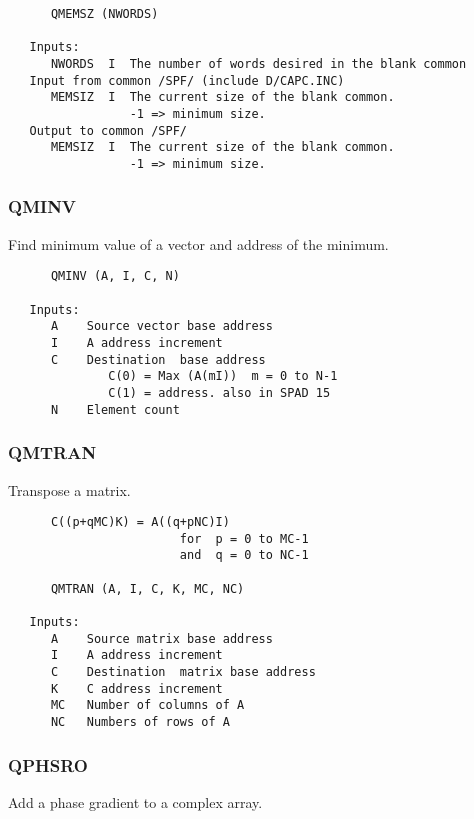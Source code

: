 \begin{verbatim}
      QMEMSZ (NWORDS)

   Inputs:
      NWORDS  I  The number of words desired in the blank common
   Input from common /SPF/ (include D/CAPC.INC)
      MEMSIZ  I  The current size of the blank common.
                 -1 => minimum size.
   Output to common /SPF/
      MEMSIZ  I  The current size of the blank common.
                 -1 => minimum size.

\end{verbatim}
\subsubsection{QMINV }
Find minimum value of a vector and address of the minimum.

\begin{verbatim}
      QMINV (A, I, C, N)

   Inputs:
      A    Source vector base address
      I    A address increment
      C    Destination  base address
              C(0) = Max (A(mI))  m = 0 to N-1
              C(1) = address. also in SPAD 15
      N    Element count

\end{verbatim}
\subsubsection{QMTRAN }
Transpose a matrix.

\begin{verbatim}
      C((p+qMC)K) = A((q+pNC)I)
                        for  p = 0 to MC-1
                        and  q = 0 to NC-1

      QMTRAN (A, I, C, K, MC, NC)

   Inputs:
      A    Source matrix base address
      I    A address increment
      C    Destination  matrix base address
      K    C address increment
      MC   Number of columns of A
      NC   Numbers of rows of A

\end{verbatim}
\subsubsection{QPHSRO }
Add a phase gradient to a complex array.

